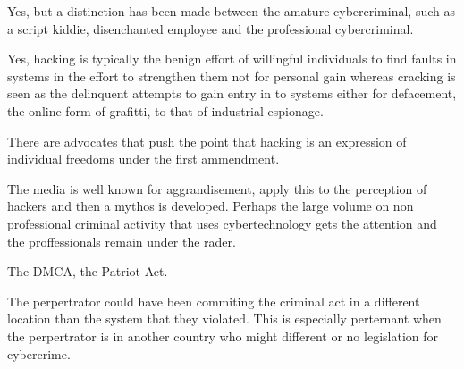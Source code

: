 

Yes, but a distinction has been made between the amature cybercriminal, such as a script kiddie, disenchanted employee and the professional cybercriminal.



Yes, hacking is typically the benign effort of willingful individuals to find faults in systems in the effort to strengthen them not for personal gain whereas cracking is seen as the delinquent attempts to gain entry in to systems either for defacement, the online form of grafitti, to that of industrial espionage.



There are advocates that push the point that hacking is an expression of individual freedoms under the first ammendment.



The media is well known for aggrandisement, apply this to the perception of hackers and then a mythos is developed. Perhaps the large volume on non professional criminal activity that uses cybertechnology gets the attention and the proffessionals remain under the rader.



The DMCA, the Patriot Act.



The perpertrator could have been commiting the criminal act in a different location than the system that they violated. This is especially perternant when the perpertrator is in another country who might different or no legislation for cybercrime.


